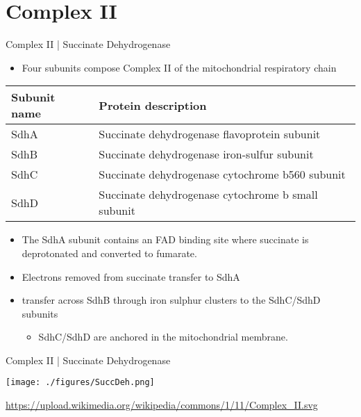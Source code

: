 \documentclass[presentation, smaller]{beamer}
\begin{document}
\section{Complex II}
\label{sec:orga96a87c}
\begin{frame}[label={sec:org98ceb1f}]{Complex II | Succinate Dehydrogenase}
\begin{itemize}
\item Four subunits compose Complex II of the mitochondrial respiratory chain
\end{itemize}

\begin{center}
\begin{tabular}{ll}
Subunit name & Protein description\\
\hline
SdhA & Succinate dehydrogenase flavoprotein subunit\\
SdhB & Succinate dehydrogenase iron-sulfur subunit\\
SdhC & Succinate dehydrogenase cytochrome b560 subunit\\
SdhD & Succinate dehydrogenase cytochrome b small subunit\\
\end{tabular}
\end{center}

\begin{itemize}
\item The SdhA subunit contains an FAD binding site where succinate
is deprotonated and converted to fumarate.
\end{itemize}


\begin{itemize}
\item Electrons removed from succinate transfer to SdhA
\item transfer across SdhB through iron sulphur clusters to the SdhC/SdhD subunits
\begin{itemize}
\item SdhC/SdhD are anchored in the mitochondrial membrane.
\end{itemize}
\end{itemize}
\end{frame}

\begin{frame}[label={sec:orgcfef955}]{Complex II | Succinate Dehydrogenase}
\begin{center}
\texttt{[image: ./figures/SuccDeh.png]}
\end{center}

\url{https://upload.wikimedia.org/wikipedia/commons/1/11/Complex\_II.svg}
\end{frame}
\end{document}
